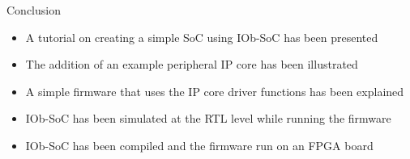 \documentclass [xcolor=svgnames, t] {beamer}
\begin{document}
\begin{frame}{Conclusion}  
  \begin{itemize}
  \item A tutorial on creating a simple SoC using IOb-SoC has been presented
  \item The addition of an example peripheral IP core has been illustrated
  \item A simple firmware that uses the IP core driver functions has been explained
  \item IOb-SoC has been simulated at the RTL level while running the firmware
  \item IOb-SoC has been compiled and the firmware run on an FPGA board
  \end{itemize}
\end{frame}

\end{document}
